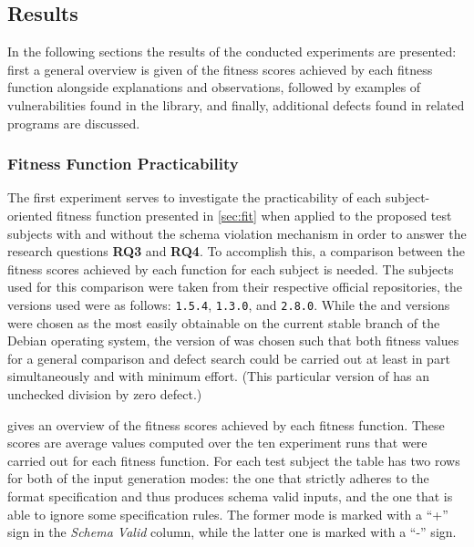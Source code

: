 \subsection{Results}
In the following sections the results of the conducted experiments are presented: first a general overview is
given of the fitness scores achieved by each fitness function alongside explanations and observations,
followed by examples of vulnerabilities found in the \libpng library, and finally, additional defects found in
related programs are discussed.

\subsubsection{Fitness Function Practicability}
The first experiment serves to investigate the practicability of each subject-oriented fitness function
presented in \cref{sec:fit} when applied to the proposed test subjects with and without the schema violation
mechanism in order to answer the research questions \textbf{RQ3} and \textbf{RQ4}. 
To accomplish this, a comparison
between the fitness scores achieved by each function for each subject is needed.
The subjects used for this comparison were taken from their respective official repositories, the versions
used were as follows: \libpng \texttt{1.5.4}, \libpcap \texttt{1.3.0}, and \libxml \texttt{2.8.0}. While the
\libpcap and \libxml versions were chosen as the most easily obtainable on the current stable branch of the
Debian operating system, the version of \libpng was chosen such that both fitness values for a general
comparison and defect search could be carried out at least in part simultaneously and with minimum effort.
(This particular version of \libpng has an unchecked division by zero defect.)

 gives an overview of
the fitness scores achieved by each fitness function. These scores are average values computed over the ten
experiment runs that were carried out for each fitness function. For each test subject the table has two rows
for both of the input generation modes: the one that strictly adheres to the format specification and thus
produces schema valid inputs, and the one that is able to ignore some specification rules. The former mode is
marked with a ``+'' sign in the \emph{Schema Valid} column, while the latter one is marked with a ``-'' sign.

